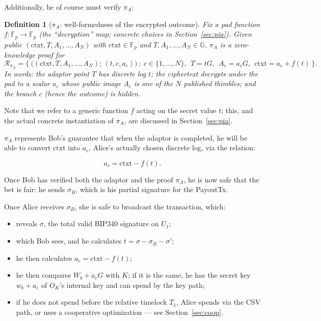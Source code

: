 \documentclass[11pt]{article}
\newtheorem{definition}{Definition}
\begin{document}
Additionally, he of course must verify $\pi_A$:

\begin{definition}[$\pi_A$: well-formedness of the encrypted outcome]
\label{def:piA}
Fix a pad function $f:\mathbb{F}_p\to\mathbb{F}_p$ (the ``decryption'' map; concrete choices in Section~\ref{sec:pia}). Given public $(\textrm{ctxt},T,A_1,\dots,A_N)$ with $\textrm{ctxt}\in\mathbb{F}_p$ and $T,A_1,\dots,A_N\in\mathbb{G}$, $\pi_A$ is a zero-knowledge proof for
\[
\mathcal{R}_{\pi_A}=\Big\{\ \big((\textrm{ctxt},T,A_1,\dots,A_N);\,(t,c,a_c)\big)\ :\ c\in\{1,\dots,N\},\ \ T=tG,\ \ A_c=a_c G,\ \ \textrm{ctxt}=a_c+f(t)\ \Big\}.
\]
In words: the adaptor point $T$ has discrete log $t$; the ciphertext decrypts under the pad to a scalar $a_c$ whose public image $A_c$ is one of the $N$ published thimbles; and the branch $c$ (hence the outcome) is hidden.
\end{definition}

Note that we refer to a generic function $f$ acting on the secret value $t$; this, and the actual concrete instantiation of $\pi_A$, are discussed in Section~\ref{sec:pia}.

$\pi_A$ represents Bob's guarantee that when the adaptor is completed, he will be able to convert $\textrm{ctxt}$ into $a_c$, Alice's actually chosen discrete log, via the relation:

\[a_c = \textrm{ctxt} - f(t).\]

Once Bob has verified both the adaptor and the proof $\pi_A$, he is now safe that the bet is fair: he sends $\sigma_B$, which is his partial signature for the PayoutTx.

Once Alice receives $\sigma_B$, she is safe to broadcast the transaction, which:

\begin{itemize}
\item reveals $\sigma$, the total valid BIP340 signature on $U_1$;
\item which Bob sees, and he calculates $t = \sigma - \sigma_B - \sigma'$;
\item he then calculates $a_c = \textrm{ctxt} - f(t)$;
\item he then compares $W_b + a_c G$ with $K$; if it is the same, he has the secret key $w_b+a_c$ of $O_K$'s internal key and can spend by the key path;
\item if he does not spend before the relative timelock $T_1$, Alice spends via the CSV path, or uses a cooperative optimization --- see Section~\ref{sec:coop}.
\end{itemize}
\end{document}
